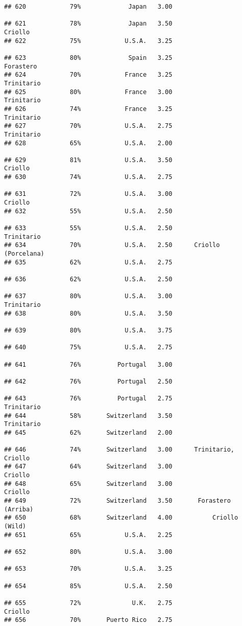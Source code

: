 \documentclass[
]{article}
\begin{document}
\begin{verbatim}
## 620            79%             Japan   3.00                         
## 621            78%             Japan   3.50                  Criollo
## 622            75%            U.S.A.   3.25                         
## 623            80%             Spain   3.25                Forastero
## 624            70%            France   3.25               Trinitario
## 625            80%            France   3.00               Trinitario
## 626            74%            France   3.25               Trinitario
## 627            70%            U.S.A.   2.75               Trinitario
## 628            65%            U.S.A.   2.00                         
## 629            81%            U.S.A.   3.50                  Criollo
## 630            74%            U.S.A.   2.75                         
## 631            72%            U.S.A.   3.00                  Criollo
## 632            55%            U.S.A.   2.50                         
## 633            55%            U.S.A.   2.50               Trinitario
## 634            70%            U.S.A.   2.50      Criollo (Porcelana)
## 635            62%            U.S.A.   2.75                         
## 636            62%            U.S.A.   2.50                         
## 637            80%            U.S.A.   3.00               Trinitario
## 638            80%            U.S.A.   3.50                         
## 639            80%            U.S.A.   3.75                         
## 640            75%            U.S.A.   2.75                         
## 641            76%          Portugal   3.00                         
## 642            76%          Portugal   2.50                         
## 643            76%          Portugal   2.75               Trinitario
## 644            58%       Switzerland   3.50               Trinitario
## 645            62%       Switzerland   2.00                         
## 646            74%       Switzerland   3.00      Trinitario, Criollo
## 647            64%       Switzerland   3.00                  Criollo
## 648            65%       Switzerland   3.00                  Criollo
## 649            72%       Switzerland   3.50       Forastero (Arriba)
## 650            68%       Switzerland   4.00           Criollo (Wild)
## 651            65%            U.S.A.   2.25                         
## 652            80%            U.S.A.   3.00                         
## 653            70%            U.S.A.   3.25                         
## 654            85%            U.S.A.   2.50                         
## 655            72%              U.K.   2.75                  Criollo
## 656            70%       Puerto Rico   2.75                         

\end{verbatim}
\end{document}

